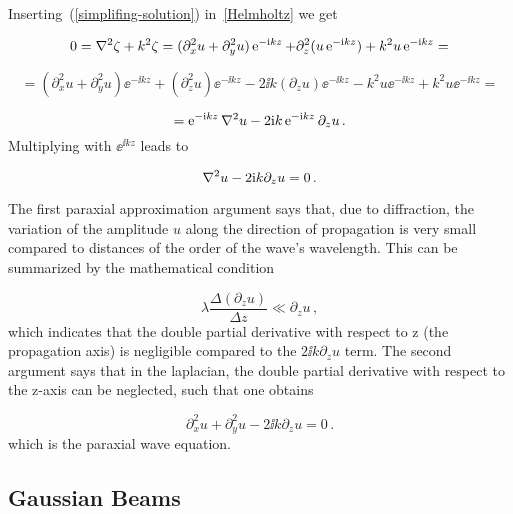 \documentclass[12pt, class=report, crop=false]{standalone}
\begin{document}
\par
Inserting~(\ref{simplifing-solution}) in~\cref{Helmholtz} we get

\begin{equation*}
  0 = \laplacian{\zeta} + k^2 \zeta = (\partial_x^2 u + \partial_y^2 u) \ee^{-\ii kz} + \partial_z^2 (u \ee^{-\ii kz}) + k^2 u \ee^{-\ii kz} =
\end{equation*}

\begin{equation*}
  = (\partial_x^2 u + \partial_y^2 u) \ee^{-\ii kz} + (\partial_z^2 u) \ee^{-\ii kz} - 2 \ii k (\partial_z u) \ee^{-\ii kz} - k^2 u\ee^{-\ii kz} + k^2 u \ee^{-\ii kz} =
\end{equation*}

\begin{equation*}
  = \ee^{-\ii kz} \laplacian{u} - 2 \ii k \ee^{-\ii kz} \partial_z u\,.
\end{equation*}
Multiplying with \(\ee^{\ii kz}\) leads to

\begin{equation}
  \laplacian{u} - 2 \ii k \partial_z u = 0\,.
\end{equation}

\par
The first paraxial approximation argument says that, due to diffraction, the variation of the amplitude \(u\) along the direction of propagation is very small compared to distances of the order of the wave's wavelength. This can be summarized by the mathematical condition

\begin{equation}
  \lambda \frac{\Delta (\partial_z u)}{\Delta z} \ll \partial_z u \,,
\end{equation}
which indicates that the double partial derivative with respect to z (the propagation axis) is negligible compared to the \(2 \ii k \partial_z u\) term. The second argument says that in the laplacian, the double partial derivative with respect to the z-axis can be neglected, such that one obtains

\begin{equation}
  \label{eq:paraxial-wave-equation}
  \partial_x^2 u+ \partial_y^2 u -2 \ii k \partial_z u = 0 \,.
\end{equation}
which is the paraxial wave equation.

\subsection{Gaussian Beams}
\end{document}
